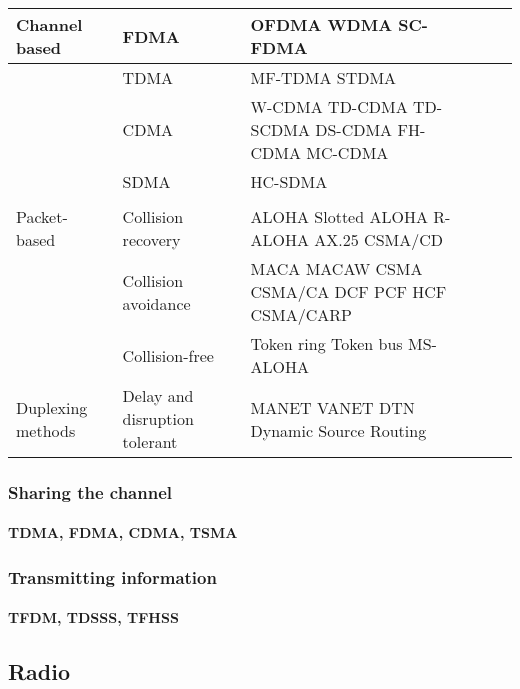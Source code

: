 \begin{table}[h!]
\scriptsize
	\begin{tabulary}{\textwidth}{L|L|L|L|L}
	Channel based & FDMA                          & OFDMA WDMA SC-FDMA                              &  & \\\hline
	\             & TDMA                          & MF-TDMA STDMA                                   &  & \\\hline
	\             & CDMA                          & W-CDMA TD-CDMA TD-SCDMA DS-CDMA FH-CDMA MC-CDMA &  & \\\hline
	\             & SDMA                          & HC-SDMA                                         &  & \\\hline                                               &  & \\\hline
	Packet-based  & Collision recovery            & ALOHA Slotted ALOHA R-ALOHA AX.25 CSMA/CD       &  & \\\hline
	\             & Collision avoidance           & MACA MACAW CSMA CSMA/CA DCF PCF HCF CSMA/CARP   &  & \\\hline
	\             & Collision-free                & Token ring Token bus MS-ALOHA                   &  & \\\hline
	Duplexing methods  & Delay and disruption tolerant & MANET VANET DTN Dynamic Source Routing          &  & \\\hline

	\end{tabulary}
\caption{\label{tab:} }
\end{table}

\subsubsection{Sharing the channel}
\paragraph{TDMA, FDMA, CDMA, TSMA}

\subsubsection{Transmitting information}
\paragraph{TFDM, TDSSS, TFHSS}

\subsection{Radio}


